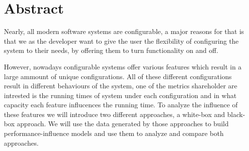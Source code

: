 \begingroup
\let\clearpage\relax
\let\cleardoublepage\relax
\let\cleardoublepage\relax

\chapter*{Abstract}
Nearly, all modern software systems are configurable, a major reasons for that is that we as the developer 
want to give the user the flexibility of configuring the system to their needs, by offering them to turn functionality on and off. 

However, nowadays configurable systems offer various features which result in a large ammount of unique configurations. All of these different
configurations result in different behaviours of the system, one of the metrics shareholder are intrested 
is the running times of system under each configuration and in what capacity each feature influcences
the running time. To analyze the influence of these features we will introduce two different approaches, a white-box and black-box
approach. We will use the data generated by those approaches to build performance-influence models and use them to analyze and compare both
approaches. 

\vfill

\endgroup

\vfill
